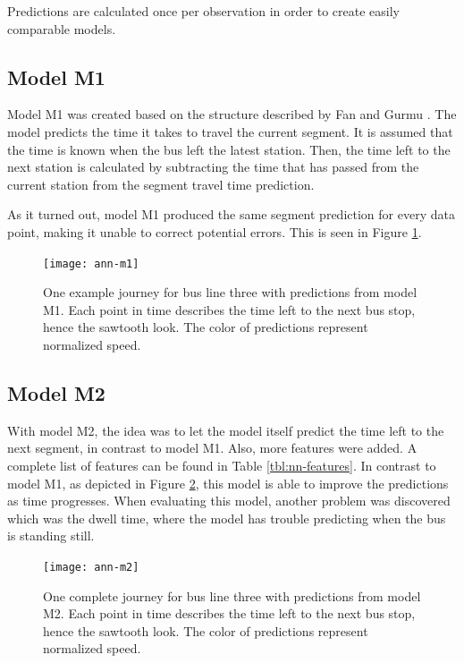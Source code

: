 Predictions are calculated once per observation in order to create easily comparable models.

\subsection{Model M1}
Model M1 was created based on the structure described by Fan and Gurmu \cite{brazilANN}. The model predicts the time it takes to travel the current segment. It is assumed that the time is known when the bus left the latest station. Then, the time left to the next station is calculated by subtracting the time that has passed from the current station from the segment travel time prediction.

As it turned out, model M1 produced the same segment prediction for every data point, making it unable to correct potential errors. This is seen in Figure \ref{fig:ann-m1}.


\begin{figure}[h]
	\begin{minipage}{\textwidth}
		\begin{adjustbox}{center}
			\texttt{[image: ann-m1]}
		\end{adjustbox}  
		\caption{One example journey for bus line three with predictions from model M1. Each point in time describes the time left to the next bus stop, hence the sawtooth look. The color of predictions represent normalized speed.}
		\label{fig:ann-m1}      
	\end{minipage}
\end{figure}


\subsection{Model M2}\label{M2}
With model M2, the idea was to let the model itself predict the time left to the next segment, in contrast to model M1. Also, more features were added. A complete list of features can be found in Table \ref{tbl:nn-features}. In contrast to model M1, as depicted in Figure \ref{fig:ann-m2}, this model is able to improve the predictions as time progresses. When evaluating this model, another problem was discovered which was the dwell time, where the model has trouble predicting when the bus is standing still. 


\begin{figure}[h]
	\begin{minipage}{\textwidth}
		\begin{adjustbox}{center}
			\texttt{[image: ann-m2]}
		\end{adjustbox}  
		\caption{One complete journey for bus line three with predictions from model M2. Each point in time describes the time left to the next bus stop, hence the sawtooth look. The color of predictions represent normalized speed.}
		\label{fig:ann-m2}      
	\end{minipage}
\end{figure}




